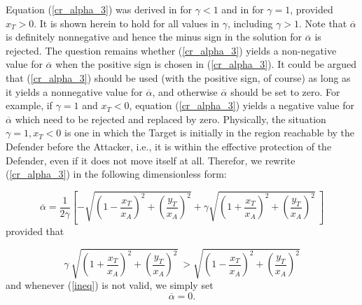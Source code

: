 Equation (\ref{cr_alpha_3}) was derived in \cite{garcia2015escape} for $\gamma<1$ and in \cite{pachter2014active} for $\gamma=1$, provided $x_{T}>0$. It is shown herein to hold for all values in $\gamma$, including $\gamma>1$. Note that $\overline{\alpha}$ is definitely nonnegative and hence the minus sign in the solution for $\overline{\alpha}$ is rejected. The question remains whether (\ref{cr_alpha_3}) yields a non-negative value for $\overline{\alpha}$ when the positive sign is chosen in (\ref{cr_alpha_3}). It could be argued that (\ref{cr_alpha_3}) should be used (with the positive sign, of course) as long as it yields a nonnegative value for  $\overline{\alpha}$, and otherwise  $\overline{\alpha}$ should be set to zero. For example, if $\gamma=1$ and $x_T<0$, equation (\ref{cr_alpha_3}) yields a negative value for $\overline{\alpha}$ which need to be rejected and replaced by zero. Physically, the situation ${\gamma=1, x_T<0}$ is one in which the Target is initially in the region reachable by the Defender before the Attacker, i.e., it is within the effective protection of the Defender, even if it does not move itself at all. Therefor, we rewrite (\ref{cr_alpha_3}) in the following dimensionless form:

\begin{equation}
\overline{\alpha} = \dfrac{1}{2 \gamma} [-\sqrt{(1-\dfrac{x_T}{x_A})^2 + (\dfrac{y_T}{x_A})^2}+ \gamma \sqrt{(1+\dfrac{x_T}{x_A})^2 + (\dfrac{y_T}{x_A})^2}\ ]
\label{dimensionless-alphaCR}
\end{equation} 
provided that 

\begin{equation}
\gamma\ \sqrt{(1+\dfrac{x_T}{x_A})^2 + (\dfrac{y_T}{x_A})^2}\ > \sqrt{(1-\dfrac{x_T}{x_A})^2 + (\dfrac{y_T}{x_A})^2}
\label{ineq}
\end{equation}
and whenever (\ref{ineq}) is not valid, we simply set
\begin{equation}
\overline{\alpha}=0.
\end{equation}


